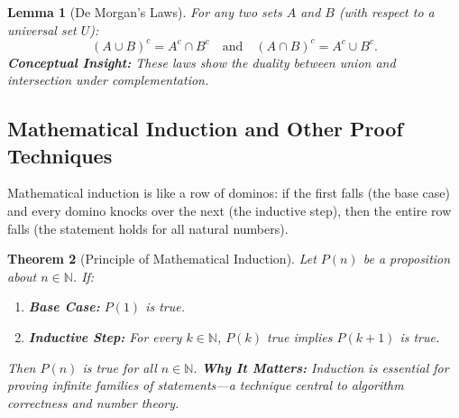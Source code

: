 \documentclass[12pt]{article}
\newtheorem{theorem}{Theorem}[section]
\newtheorem{lemma}[theorem]{Lemma}
\theoremstyle{definition}
\begin{document}
\begin{lemma}[De Morgan's Laws]
  For any two sets \(A\) and \(B\) (with respect to a universal set \(U\)):
  \[
  (A \cup B)^c = A^c \cap B^c \quad \text{and} \quad (A \cap B)^c = A^c \cup B^c.
  \]
  \vspace{0.5em}
  \textbf{Conceptual Insight:} These laws show the duality between union and intersection under complementation.
\end{lemma}

\begin{center}
\end{center}

\subsection{Mathematical Induction and Other Proof Techniques}

Mathematical induction is like a row of dominos: if the first falls (the base case) and every domino knocks over the next (the inductive step), then the entire row falls (the statement holds for all natural numbers).

\begin{theorem}[Principle of Mathematical Induction]
  Let \(P(n)\) be a proposition about \(n \in \mathbb{N}\). If:
  \begin{enumerate}[label=(\roman*)]
    \item \textbf{Base Case:} \(P(1)\) is true.
    \item \textbf{Inductive Step:} For every \(k \in \mathbb{N}\), \(P(k)\) true implies \(P(k+1)\) is true.
  \end{enumerate}
  Then \(P(n)\) is true for all \(n \in \mathbb{N}\).
  \vspace{0.5em}
  \textbf{Why It Matters:} Induction is essential for proving infinite families of statements—a technique central to algorithm correctness and number theory.
\end{theorem}
\end{document}

